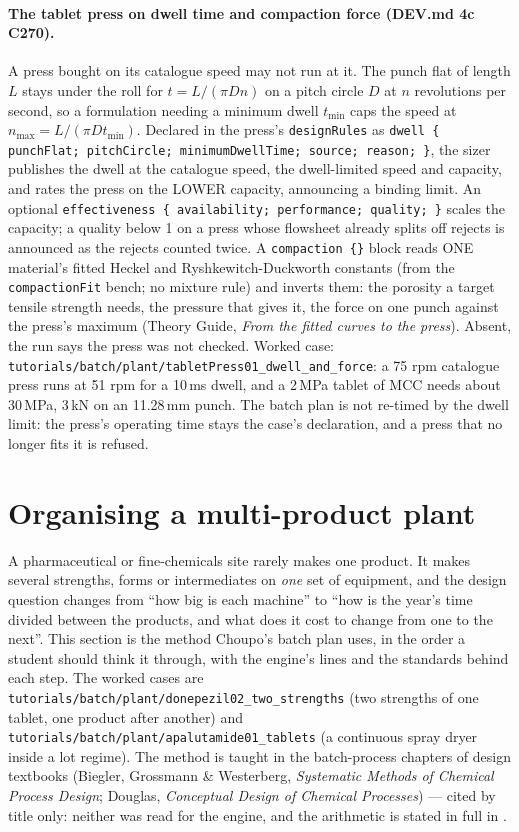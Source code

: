 \documentclass[11pt,a4paper]{article}
\begin{document}
\paragraph{The tablet press on dwell time and compaction force (DEV.md 4c
C270).}  A press bought on its catalogue speed may not run at it.  The punch
flat of length $L$ stays under the roll for $t = L/(\pi D n)$ on a pitch
circle $D$ at $n$ revolutions per second, so a formulation needing a minimum
dwell $t_\text{min}$ caps the speed at $n_\text{max} = L/(\pi D
t_\text{min})$. Declared in the press's \texttt{designRules} as
\texttt{dwell \{ punchFlat; pitchCircle; minimumDwellTime; source; reason;
\}}, the sizer publishes the dwell at the catalogue speed, the dwell-limited
speed and capacity, and rates the press on the LOWER capacity, announcing a
binding limit. An optional \texttt{effectiveness \{ availability;
performance; quality; \}} scales the capacity; a quality below 1 on a press
whose flowsheet already splits off rejects is announced as the rejects
counted twice. A \texttt{compaction \{\}} block reads ONE material's fitted
Heckel and Ryshkewitch-Duckworth constants (from the \texttt{compactionFit}
bench; no mixture rule) and inverts them: the porosity a target tensile
strength needs, the pressure that gives it, the force on one punch against
the press's maximum (Theory Guide, \emph{From the fitted curves to the
press}). Absent, the run says the press was not checked. Worked case:
\texttt{tutorials/batch/plant/tabletPress01\_dwell\_and\_force}: a 75 rpm
catalogue press runs at 51 rpm for a 10\,ms dwell, and a 2\,MPa tablet of
MCC needs about 30\,MPa, 3\,kN on an 11.28\,mm punch. The batch plan is
not re-timed by the dwell limit: the press's operating time stays the
case's declaration, and a press that no longer fits it is refused.

\hypertarget{organising-a-multi-product-plant}{%
\section{Organising a multi-product
plant}\label{organising-a-multi-product-plant}}

A pharmaceutical or fine-chemicals site rarely makes one product. It
makes several strengths, forms or intermediates on \emph{one} set of
equipment, and the design question changes from ``how big is each
machine'' to ``how is the year's time divided between the products, and
what does it cost to change from one to the next''. This section is the
method Choupo's batch plan uses, in the order a student should think it
through, with the engine's lines and the standards behind each step.
The worked cases are
\texttt{tutorials/batch/plant/donepezil02\_two\_strengths} (two
strengths of one tablet, one product after another) and
\texttt{tutorials/batch/plant/apalutamide01\_tablets} (a continuous
spray dryer inside a lot regime). The method is taught in the
batch-process chapters of design textbooks (Biegler, Grossmann \&
Westerberg, \emph{Systematic Methods of Chemical Process Design};
Douglas, \emph{Conceptual Design of Chemical Processes}) --- cited by
title only: neither was read for the engine, and the arithmetic is stated
in full in .
\end{document}
